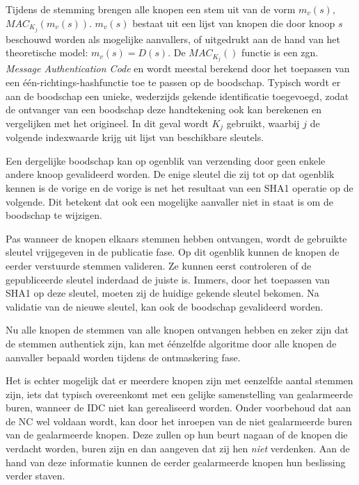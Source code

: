 Tijdens de stemming brengen alle knopen een stem uit van de vorm $m_v(s),$ $
MAC_{K_j}(m_v(s))$. $m_v(s)$ bestaat uit een lijst van knopen die door knoop
$s$ beschouwd worden als mogelijke aanvallers, of uitgedrukt aan de hand van
het theoretische model: $m_v(s) = D(s)$. De $MAC_{K_j}()$ functie is een zgn.
\emph{Message Authentication Code} \citep{rfc:2104} en wordt meestal berekend
door het toepassen van een \'e\'en-richtings-hashfunctie toe te passen op de
boodschap. Typisch wordt er aan de boodschap een unieke, wederzijds gekende
identificatie toegevoegd, zodat de ontvanger van een boodschap deze
handtekening ook kan berekenen en vergelijken met het origineel. In dit geval
wordt $K_j$ gebruikt, waarbij $j$ de volgende indexwaarde krijg uit lijst van
beschikbare sleutels.

Een dergelijke boodschap kan op ogenblik van verzending door geen enkele andere
knoop gevalideerd worden. De enige sleutel die zij tot op dat ogenblik kennen
is de vorige en de vorige is net het resultaat van een SHA1 operatie op de
volgende. Dit betekent dat ook een mogelijke aanvaller niet in staat is om de
boodschap te wijzigen.

Pas wanneer de knopen elkaars stemmen hebben ontvangen, wordt de gebruikte
sleutel vrijgegeven in de publicatie fase. Op dit ogenblik kunnen de knopen de
eerder verstuurde stemmen valideren. Ze kunnen eerst controleren of de
gepubliceerde sleutel inderdaad de juiste is. Immers, door het toepassen van
SHA1 op deze sleutel, moeten zij de huidige gekende sleutel bekomen. Na
validatie van de nieuwe sleutel, kan ook de boodschap gevalideerd worden.

Nu alle knopen de stemmen van alle knopen ontvangen hebben en zeker zijn dat de
stemmen authentiek zijn, kan met \'e\'enzelfde algoritme door alle knopen de
aanvaller bepaald worden tijdens de ontmaskering fase.

Het is echter mogelijk dat er meerdere knopen zijn met eenzelfde aantal stemmen
zijn, iets dat typisch overeenkomt met een gelijke samenstelling van
gealarmeerde buren, wanneer de IDC niet kan gerealiseerd worden. Onder
voorbehoud dat aan de NC wel voldaan wordt, kan door het inroepen van de niet
gealarmeerde buren van de gealarmeerde knopen. Deze zullen op hun beurt nagaan
of de knopen die verdacht worden, buren zijn en dan aangeven dat zij hen
\emph{niet} verdenken. Aan de hand van deze informatie kunnen de eerder
gealarmeerde knopen hun beslissing verder staven.

